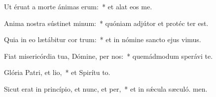\item Ut éruat a morte ánimas erum:~* et alat eos  me.
\item Anima nostra sústinet minum:~* quóniam adjútor et protéc ter est.
\item Quia in eo lætábitur cor trum:~* et in nómine sancto ejus vimus.
\item Fiat misericórdia tua, Dómine, per nos:~* quemádmodum sperávi  te.
\item Glória Patri, et lio,~* et Spirítu to.
\item Sicut erat in princípio, et nunc, et per,~* et in sǽcula sæculó. men.
